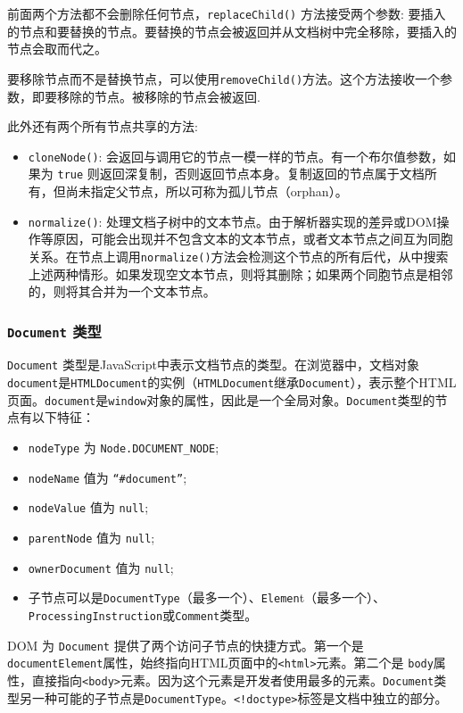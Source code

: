 前面两个方法都不会删除任何节点，\texttt{replaceChild()} 方法接受两个参数: 要插入的节点和要替换的节点。要替换的节点会被返回并从文档树中完全移除，要插入的节点会取而代之。

要移除节点而不是替换节点，可以使用\texttt{removeChild()}方法。这个方法接收一个参数，即要移除的节点。被移除的节点会被返回.

此外还有两个所有节点共享的方法:
\begin{itemize}
    \item \texttt{cloneNode()}: 会返回与调用它的节点一模一样的节点。有一个布尔值参数，如果为 \texttt{true} 则返回深复制，否则返回节点本身。复制返回的节点属于文档所有，但尚未指定父节点，所以可称为孤儿节点（orphan）。
    \item \texttt{normalize()}: 处理文档子树中的文本节点。由于解析器实现的差异或DOM操作等原因，可能会出现并不包含文本的文本节点，或者文本节点之间互为同胞关系。在节点上调用\texttt{normalize()}方法会检测这个节点的所有后代，从中搜索上述两种情形。如果发现空文本节点，则将其删除；如果两个同胞节点是相邻的，则将其合并为一个文本节点。
\end{itemize}

\subsubsection{\texttt{Document} 类型}

\texttt{Document} 类型是JavaScript中表示文档节点的类型。在浏览器中，文档对象\texttt{document}是\texttt{HTMLDocument}的实例（\texttt{HTMLDocument}继承\texttt{Document}），表示整个HTML页面。\texttt{document}是\texttt{window}对象的属性，因此是一个全局对象。\texttt{Document}类型的节点有以下特征：

\begin{itemize}
    \item \texttt{nodeType} 为 \texttt{Node.DOCUMENT\_NODE};
    \item \texttt{nodeName} 值为 \texttt{``\#document''};
    \item \texttt{nodeValue} 值为 \texttt{null};
    \item \texttt{parentNode} 值为 \texttt{null};
    \item \texttt{ownerDocument} 值为 \texttt{null};
    \item 子节点可以是\texttt{DocumentType}（最多一个）、\texttt{Elemen}t（最多一个）、\texttt{ProcessingInstruction}或\texttt{Comment}类型。
\end{itemize}

DOM 为 \texttt{Document} 提供了两个访问子节点的快捷方式。第一个是\texttt{documentElement}属性，始终指向HTML页面中的\texttt{<html>}元素。第二个是 \texttt{body}属性，直接指向\texttt{<body>}元素。因为这个元素是开发者使用最多的元素。\texttt{Document}类型另一种可能的子节点是\texttt{DocumentType}。\texttt{<!doctype>}标签是文档中独立的部分。

